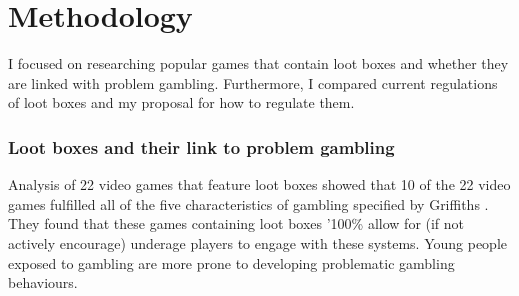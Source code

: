 \documentclass[10pt,oneside,english,a4paper]{article}
\begin{document}
\section{Methodology}

I focused on researching popular games that contain loot boxes and whether they are linked with problem gambling.
Furthermore, I compared current regulations of loot boxes and my proposal for how to regulate them.


\subsubsection{Loot boxes and their link to problem gambling} \label{sec:link}

	Analysis of 22 video games\cite{nature:psycho} that feature loot boxes showed that 10 of the 22 video games fulfilled all of the five characteristics of gambling specified by Griffiths \cite{gambling:characteristics}.  They found that these games containing loot boxes  '100\% allow for (if not actively encourage) underage players to engage with these systems. Young people exposed to gambling are more prone to developing problematic gambling behaviours\cite{springer:risks}. \par
\end{document}
